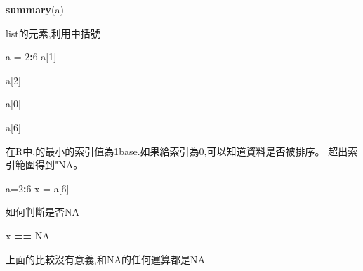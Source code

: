 \documentclass[]{book}
\newenvironment{Shaded}{\begin{snugshade}}{\end{snugshade}}
\newcommand{\DecValTok}[1]{\textcolor[rgb]{0.00,0.00,0.81}{#1}}
\newcommand{\KeywordTok}[1]{\textcolor[rgb]{0.13,0.29,0.53}{\textbf{#1}}}
\newcommand{\NormalTok}[1]{#1}
\newcommand{\OperatorTok}[1]{\textcolor[rgb]{0.81,0.36,0.00}{\textbf{#1}}}
\newcommand{\OtherTok}[1]{\textcolor[rgb]{0.56,0.35,0.01}{#1}}
\newcommand{\StringTok}[1]{\textcolor[rgb]{0.31,0.60,0.02}{#1}}
\theoremstyle{definition}
\theoremstyle{definition}
\theoremstyle{definition}
\theoremstyle{remark}
\begin{document}
\begin{Shaded}
\begin{Highlighting}[]
\KeywordTok{summary}\NormalTok{(a)}
\end{Highlighting}
\end{Shaded}

list的元素,利用中括號

\begin{Shaded}
\begin{Highlighting}[]
\NormalTok{a =}\StringTok{ }\DecValTok{2}\OperatorTok{:}\DecValTok{6}
\NormalTok{a[}\DecValTok{1}\NormalTok{]}
\end{Highlighting}
\end{Shaded}

\begin{Shaded}
\begin{Highlighting}[]
\NormalTok{a[}\DecValTok{2}\NormalTok{]}
\end{Highlighting}
\end{Shaded}

\begin{Shaded}
\begin{Highlighting}[]
\NormalTok{a[}\DecValTok{0}\NormalTok{]}
\end{Highlighting}
\end{Shaded}

\begin{Shaded}
\begin{Highlighting}[]
\NormalTok{a[}\DecValTok{6}\NormalTok{]}
\end{Highlighting}
\end{Shaded}

在R中,的最小的索引值為1base.如果給索引為0,可以知道資料是否被排序。
超出索引範圍得到"NA。

\begin{Shaded}
\begin{Highlighting}[]
\NormalTok{a=}\DecValTok{2}\OperatorTok{:}\DecValTok{6}
\NormalTok{x =}\StringTok{ }\NormalTok{a[}\DecValTok{6}\NormalTok{]}
\end{Highlighting}
\end{Shaded}

如何判斷是否NA

\begin{Shaded}
\begin{Highlighting}[]
\NormalTok{x }\OperatorTok{==}\StringTok{ }\OtherTok{NA}
\end{Highlighting}
\end{Shaded}

上面的比較沒有意義,和NA的任何運算都是NA
\end{document}
